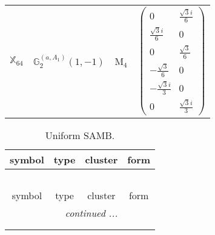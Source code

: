 \documentclass[fleqn,10pt,landscape]{article}
\begin{document}
\begin{itemize}
\begin{center}
\begin{longtable}{c|c|c|c}
$ \mathbb{X}_{64} $ & $\mathbb{G}_{2}^{(a,A_{1})}(1,-1)$ & M$_{4}$ & $\begin{pmatrix} 0 & \frac{\sqrt{3} i}{6} \\ \frac{\sqrt{3} i}{6} & 0 \\ 0 & \frac{\sqrt{3}}{6} \\ - \frac{\sqrt{3}}{6} & 0 \\ - \frac{\sqrt{3} i}{3} & 0 \\ 0 & \frac{\sqrt{3} i}{3} \end{pmatrix}$ \\
\end{longtable}
\end{center}
\begin{center}
\renewcommand{\arraystretch}{1.3}
\begin{longtable}{c|c|c|c}
\caption{Uniform SAMB.}
 \\
 \hline \hline
symbol & type & cluster & form \\ \hline \endfirsthead

\multicolumn{3}{l}{\tablename\ \thetable{}} \\
 \hline \hline
symbol & type & cluster & form \\ \hline \endhead

 \hline \hline
\multicolumn{3}{r}{\footnotesize\it continued ...} \\ \endfoot

 \hline \hline
\multicolumn{3}{r}{} \\ \endlastfoot


\end{longtable}
\end{center}
\end{itemize}
\end{document}
